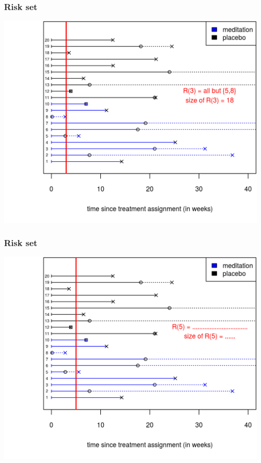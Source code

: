 \documentclass[10pt,t]{beamer}
\begin{document}
\begin{frame}
\frametitle{Risk set}
\begin{center}
\includegraphics[height=0.8\textheight]{figs/risk_set_movie_1.png}
\end{center}
\end{frame}

\begin{frame}
\frametitle{Risk set}
\begin{center}
\includegraphics[height=0.8\textheight]{figs/risk_set_movie_2.png}
\end{center}
\end{frame}
\end{document}
